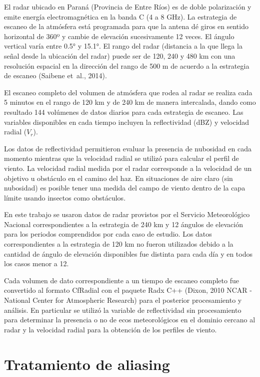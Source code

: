 \documentclass[12pt,spanish,oneside, a4paper]{book}
\begin{document}
El radar ubicado en Paraná (Provincia de Entre Ríos) es de doble
polarización y emite energía electromagnética en la banda C (4 a 8 GHz).
La estrategia de escaneo de la atmósfera está programada para que la
antena dé giros en sentido horizontal de 360º y cambie de elevación
sucesivamente 12 veces. El ángulo vertical varía entre 0.5° y 15.1°. El
rango del radar (distancia a la que llega la señal desde la ubicación
del radar) puede ser de 120, 240 y 480 km con una resolución espacial en
la dirección del rango de 500 m de acuerdo a la estrategia de escaneo
(Saibene et~al., 2014).

El escaneo completo del volumen de atmósfera que rodea al radar se
realiza cada 5 minutos en el rango de 120 km y de 240 km de manera
intercalada, dando como resultado 144 volúmenes de datos diarios para
cada estrategia de escaneo. Las variables disponibles en cada tiempo
incluyen la reflectividad (dBZ) y velocidad radial (\(V_r\)).

Los datos de reflectividad permitieron evaluar la presencia de nubosidad
en cada momento mientras que la velocidad radial se utilizó para
calcular el perfil de viento. La velocidad radial medida por el radar
corresponde a la velocidad de un objetivo u obstáculo en el camino del
haz. En situaciones de aire claro (sin nubosidad) es posible tener una
medida del campo de viento dentro de la capa límite usando insectos como
obstáculos.

En este trabajo se usaron datos de radar provistos por el Servicio
Meteorológico Nacional correspondientes a la estrategia de 240 km y 12
ángulos de elevación para los periodos comprendidos por cada caso de
estudio. Los datos correspondientes a la estrategia de 120 km no fueron
utilizados debido a la cantidad de ángulo de elevación disponibles fue
distinta para cada día y en todos los casos menor a 12.

Cada volumen de dato correspondiente a un tiempo de escaneo completo fue
convertido al formato CfRadial con el paquete Radx C++ (Dixon, 2010 NCAR
- National Center for Atmospheric Research) para el posterior
procesamiento y análisis. En particular se utilizó la variable de
reflectividad sin procesamiento para determinar la presencia o no de
ecos meteorológicos en el dominio cercano al radar y la velocidad radial
para la obtención de los perfiles de viento.

\section{Tratamiento de aliasing}\label{tratamiento-de-aliasing}
\end{document}
